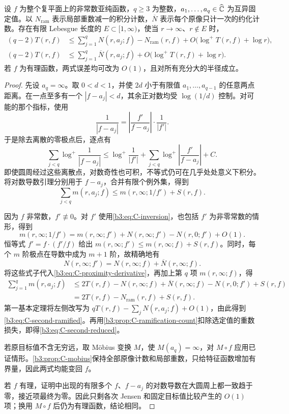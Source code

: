 \begin{theorem}[约化形式的第二基本定理]\label{b3:thm:C-second-main}
设 \(f\) 为整个复平面上的非常数亚纯函数，\(q\ge3\) 为整数，\(a_1,\ldots,a_q\in\widehat{\mathbb C\kern0pt}\) 为互异固定值。以 \(N_{\mathrm{ram}}\) 表示局部重数减一的积分计数，\(\overline N\) 表示每个原像只计一次的约化计数。存在有限 Lebesgue 长度的 \(E\subset[1,\infty)\)，使当 \(r\to\infty\)、\(r\notin E\) 时，
\begin{align}
 (q-2)T(r,f)&\le\sum_{j=1}^qN(r,a_j;f)-N_{\mathrm{ram}}(r,f)
       +O\bigl(\log^+T(r,f)+\log r\bigr),\label{b3:eq:C-second-ramified}\\
 (q-2)T(r,f)&\le\sum_{j=1}^q\overline N(r,a_j;f)
       +O\bigl(\log^+T(r,f)+\log r\bigr).\label{b3:eq:C-second-reduced}
\end{align}
若 \(f\) 为有理函数，两式误差均可改为 \(O(1)\)，且对所有充分大的半径成立。
\end{theorem}
\begin{proof}
先设 \(a_q=\infty\)。取 \(0<d<1\)，并使 \(2d\) 小于有限值 \(a_1,\ldots,a_{q-1}\) 的任意两点距离。在一点至多有一个 \(|f-a_j|<d\)，其余正对数均受 \(\log(1/d)\) 控制。对可能的那个指标，使用
\[
 \frac1{|f-a_j|}=\left|\frac{f'}{f-a_j}\right|\cdot\frac1{|f'|}.
\]
于是除去离散的零极点后，逐点有
\[
 \sum_{j<q}\log^+\frac1{|f-a_j|}
 \le\log^+\frac1{|f'|}
    +\sum_{j<q}\log^+\left|\frac{f'}{f-a_j}\right|+C.
\]
即使圆周经过这些离散点，对数奇性也可积，不等式仍可在几乎处处意义下积分。将对数导数引理分别用于 \(f-a_j\)，合并有限个例外集，得到
\begin{equation}\label{b3:eq:C-proximity-derivative}
 \sum_{j<q}m(r,a_j;f)
 \le m(r,\infty;1/f')+S(r,f).
\end{equation}

因为 \(f\) 非常数，\(f'\not\equiv0\)。对 \(f'\) 使用\eqref{b3:eq:C-inversion}，也包括 \(f'\) 为非零常数的情形，得到
\[
 m(r,\infty;1/f')=m(r,\infty;f')
        +N(r,\infty;f')-N(r,0;f')+O(1).
\]
恒等式 \(f'=f\cdot(f'/f)\) 给出
\(m(r,\infty;f')\le m(r,\infty;f)+S(r,f)\)。同时，每个 \(m\) 阶极点在导数中成为 \(m+1\) 阶，故精确地有
\[
 N(r,\infty;f')=N(r,\infty;f)+\overline N(r,\infty;f).
\]
将这些式子代入\eqref{b3:eq:C-proximity-derivative}，再加上第 \(q\) 项 \(m(r,\infty;f)\)，得
\[
 \begin{aligned}
 \sum_{j=1}^q m(r,a_j;f)
 &\le 2T(r,f)-N(r,\infty;f)+\overline N(r,\infty;f)
                   -N(r,0;f')+S(r,f)\\
 &=2T(r,f)-N_{\mathrm{ram}}(r,f)+S(r,f).
 \end{aligned}
\]
第一基本定理将左侧改写为 \(qT(r,f)-\sum_jN(r,a_j;f)+O(1)\)，由此得到\eqref{b3:eq:C-second-ramified}。再用\cref{b3:prop:C-ramification-count}扣除选定值的重数损失，即得\eqref{b3:eq:C-second-reduced}。

若原目标值不含无穷远，取 Möbius 变换 \(M\)，使 \(M(a_q)=\infty\)，对 \(M\circ f\) 应用已证情形。\cref{b3:prop:C-mobius}保持全部原像计数和局部重数，只给特征函数增加有界量，因此两式均能变回 \(f\)。

若 \(f\) 有理，证明中出现的有限多个 \(f\)、\(f-a_j\) 的对数导数在大圆周上都一致趋于零，接近项最终为零。因此只剩各次 Jensen 和固定目标值比较产生的 \(O(1)\) 项；换用 \(M\circ f\) 后仍为有理函数，结论相同。
\end{proof}

